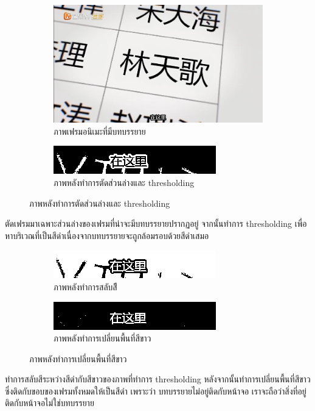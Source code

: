 \documentclass[hidelinks,a4paper,14pt]{article}
\numberwithin{equation}{section}							%
\begin{document}
{		\begin{figure}[H]
			\begin{subfigure}{0.4\linewidth}
				\centering
				\includegraphics[width=0.4\linewidth]{images/detection-original.png}
				\caption{ภาพเฟรมอนิเมะที่มีบทบรรยาย}
			\end{subfigure}
			\begin{subfigure}{0.4\linewidth}
				\centering
				\includegraphics[width=0.4\linewidth]{images/detection-threshold.png}
				\caption{ภาพหลังทำการตัดส่วนล่างและ thresholding}
			\end{subfigure}
		\end{figure}
		
		ตัดเฟรมมาเฉพาะส่วนล่างของเฟรมที่น่าจะมีบทบรรยายปรากฏอยู่ จากนั้นทำการ thresholding เพื่อหาบริเวณที่เป็นสีดำเนื่องจากบทบรรยายจะถูกล้อมรอบด้วยสีดำเสมอ
		
		\begin{figure}[H]
			\begin{subfigure}{0.4\linewidth}
				\centering
				\includegraphics[width=0.4\linewidth]{images/detection-inverse.png}
				\caption{ภาพหลังทำการสลับสีี}
			\end{subfigure}
			\begin{subfigure}{0.4\linewidth}
				\centering
				\includegraphics[width=0.4\linewidth]{images/detection-blackfill.png}
				\caption{ภาพหลังทำการเปลี่ยนพื้นที่สีขาว}
			\end{subfigure}
		\end{figure}
		
		ทำการสลับสีระหว่างสีดำกับสีขาวของภาพที่ทำการ thresholding หลังจากนั้นทำการเปลี่ยนพื้นที่สีขาวซึ่งติดกับขอบของเฟรมทั้งหมดให้เป็นสีดำ เพราะว่า บทบรรยายไม่อยู่ติดกับหน้าจอ เราจะถือว่าสิ่งที่อยู่ติดกับหน้าจอไม่ใช่บทบรรยาย
		
}
\end{document}
